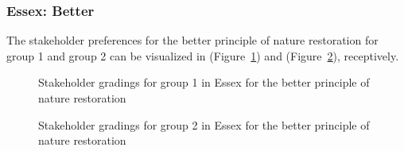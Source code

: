 \documentclass[
  12pt,
  letterpaper,
  DIV=11,
  numbers=noendperiod]{scrartcl}
\begin{document}
\newpage{}

\subsubsection{Essex: Better}\label{essex-better}

The stakeholder preferences for the better principle of nature
restoration for group 1 and group 2 can be visualized in
(Figure~\ref{fig-EsBetterG1}) and (Figure~\ref{fig-EsBetterG2}),
receptively.

\begin{figure}[H]


\caption{\label{fig-EsBetterG1}Stakeholder gradings for group 1 in Essex
for the better principle of nature restoration}

\end{figure}%

\begin{figure}[H]


\caption{\label{fig-EsBetterG2}Stakeholder gradings for group 2 in Essex
for the better principle of nature restoration}

\end{figure}%
\end{document}

